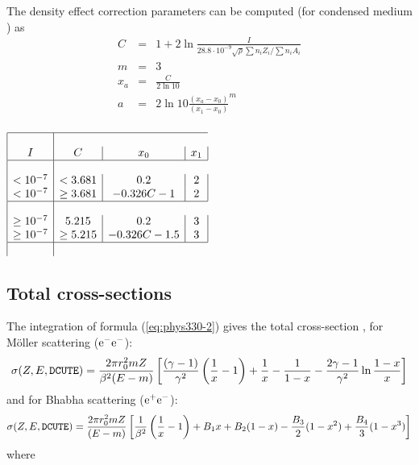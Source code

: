 The density effect correction parameters can be computed (for
condensed medium \cite{bib-STER}) as
\begin{eqnarray*}
C & = & 1 + 2\ln \frac{I}{28.8 \cdot 10^{-9} \sqrt{\rho} \sum n_i Z_i /
              \sum n_i A_i }\\
m       &=& 3                          \\
x_a     &=& \frac{C} {2\ln 10}   \\
a       &=& 2\ln 10 \frac{(x_a -x_0)}{(x_1 - x_0 )}^m \\
\end{eqnarray*}
 
\begin{center}
$ \begin{array}{|c|c|c|c|}
\hline
I        &         C    &       x_0       &             x_1\\
\hline
<10^{-7} &        <3.681      &        0.2       &            2 \\
 <10^{-7}&        \geq 3.681  &      -0.326C-1   &            2 \\
\hline
\geq10^{-7} &       5.215     &       0.2         &          3 \\
\geq10^{-7} &      \geq 5.215 &       -0.326C-1.5 &         3 \\
\hline
\end{array}$\end{center}
 
\subsection{Total cross-sections} 
The integration of formula (\ref{eq:phys330-2}) gives the total cross-section 
\cite{bib-EGS4}, \cite{bib-MESS} for M\"{o}ller scattering ($\mathrm{e}^-\mathrm{e}^-$):
\begin{equation}
\label{eq:phys330-9}
\sigma ( Z,E,\mbox{\tt DCUTE} ) =\frac {2 \pi r_0^2 mZ}{\beta^2(E-m)}
 \left[\frac{(\gamma-1)} {\gamma^2}\left(\frac{1}{x}-1\right)
             +\frac{1}{x}-\frac{1}{1-x}-\frac{2\gamma-1}{\gamma^2}\ln
\frac{1-x}{x}\right]
\end{equation}
and for Bhabha scattering ($\mathrm{e}^+ \mathrm{e}^- $):
\begin{equation}
\label{eq:phys330-10}
\sigma (Z,E,\mbox{\tt DCUTE}) =\frac{ 2 \pi r^2_0  mZ }
      {(E-m)}\left [\frac {1 }{\beta^2}  \left(\frac{1}{x}-1\right)
  + B_1 x + B_2 (1-x) -
 \frac {B_3 } {2} ( 1-x^2 ) +\frac{B_4}{3}(1-x^3)\right]
\end{equation}
where
 
